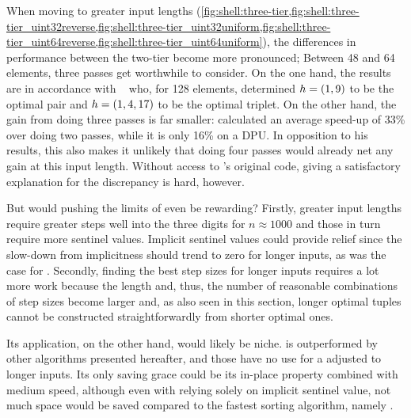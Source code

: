 When moving to greater input lengths (\cref{fig:shell:three-tier,fig:shell:three-tier_uint32reverse,fig:shell:three-tier_uint32uniform,fig:shell:three-tier_uint64reverse,fig:shell:three-tier_uint64uniform}), the differences in performance between the two-tier \ShS*{} become more pronounced;
Between 48 and 64 elements, three passes get worthwhile to consider.
On the one hand, the results are in accordance with \citeauthor{10.1007/3-540-44669-9_12}~\cite{10.1007/3-540-44669-9_12} who, for 128 elements, determined \(h = (1, 9)\) to be the optimal pair and \(h = (1, 4, 17)\) to be the optimal triplet.
On the other hand, the gain from doing three passes is far smaller:
 calculated an average speed-up of 33\% over doing two passes, while it is only 16\% on a DPU.
In opposition to his results, this also makes it unlikely that doing four passes would already net any gain at this input length.
Without access to \citeauthor{10.1007/3-540-44669-9_12}'s original code, giving a satisfactory explanation for the discrepancy is hard, however.

But would pushing the limits of \ShS{} even be rewarding?
Firstly, greater input lengths require greater steps \Dash well into the three digits for \(n \approx 1000\) \cite{skean2023optimization, 10.1007/3-540-44669-9_12} \Dash and those in turn require more sentinel values.
Implicit sentinel values could provide relief since the slow-down from implicitness should trend to zero for longer inputs, as was the case for \IS{}.
Secondly, finding the best step sizes for longer inputs requires a lot more work because the length and, thus, the number of reasonable combinations of step sizes become larger and, as also seen in this section, longer optimal tuples cannot be constructed straightforwardly from shorter optimal ones.

Its application, on the other hand, would likely be niche.
\ShS{} is outperformed by other algorithms presented hereafter, and those have no use for a \ShS{} adjusted to longer inputs.
Its only saving grace could be its in-place property combined with medium speed, although even with relying solely on implicit sentinel value, not much space would be saved compared to the fastest sorting algorithm, namely \QS{}.
